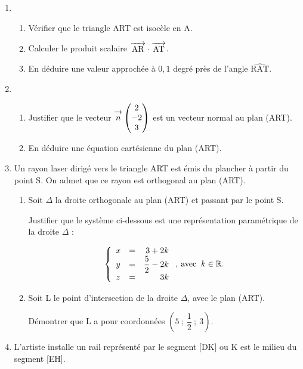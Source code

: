 \documentclass[10pt,a4paper]{article}
\newcommand{\R}{\mathbb{R}}
\newcommand{\vect}[1]{\overrightarrow{\,\mathstrut#1\,}}
\begin{document}
\begin{enumerate}
\item 
	\begin{enumerate}
		\item Vérifier que le triangle ART est isocèle en A.
		\item Calculer le produit scalaire $\vect{\text{AR}} \cdot \vect{\text{AT}}$.
		\item En déduire une valeur approchée à $0,1$ degré près de l'angle $\widehat{\text{RAT}}$.
	\end{enumerate}
\item 
	\begin{enumerate}
		\item Justifier que le vecteur $\vect{n}\begin{pmatrix}2\\-2\\3\end{pmatrix}$ est un vecteur normal au plan (ART).
		\item En déduire une équation cartésienne du plan (ART).
	\end{enumerate}
\item Un rayon laser dirigé vers le triangle ART est émis du plancher à partir du point S. On admet que ce rayon est orthogonal au plan (ART).
	\begin{enumerate}
		\item Soit $\Delta$ la droite orthogonale au plan (ART) et passant par le point S.
		
Justifier que le système ci-dessous est une représentation paramétrique de la droite $\Delta$ :

\[\left\{\begin{array}{l c r}
x&=&3+2k\\
y&=& \dfrac52 - 2k\\
z &=& 3k
\end{array}\right.,\: \text{avec }\:k \in \R.\]

		\item Soit L le point d'intersection de la droite $\Delta$, avec le plan (ART).

Démontrer que L a pour coordonnées $\left(5~;~\dfrac12~;~3\right)$.
	\end{enumerate}
\item L'artiste installe un rail représenté  par le segment  [DK] ou K est le milieu du segment [EH].


\end{enumerate}
\end{document}

